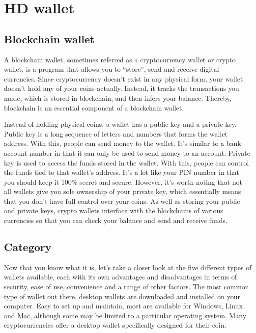 \begin{itemize}
\begin{quote}
        \end{quote}
\end{itemize}

\section{HD wallet}
\label{sec:hd_wallet}

\subsection{Blockchain wallet}
A blockchain wallet, sometimes referred as a cryptocurrency wallet or crypto wallet, is a program that allows you to “store”, send and receive digital currencies. Since cryptocurrency doesn’t exist in any physical form, your wallet doesn’t hold any of your coins actually. Instead, it tracks the transactions you made, which is stored in blockchain, and then infers your balance. Thereby, blockchain is an essential component of a blockchain wallet.

Instead of holding physical coins, a wallet has a public key and a private key. Public key is a long sequence of letters and numbers that forms the wallet address. With this, people can send money to the wallet. It's similar to a bank account number in that it can only be used to send money to an account. Private key is used to access the funds stored in the wallet. With this, people can control the funds tied to that wallet's address. It's a lot like your PIN number in that you should keep it 100\% secret and secure. However, it's worth noting that not all wallets give you sole ownership of your private key, which essentially means that you don't have full control over your coins. As well as storing your public and private keys, crypto wallets interface with the blockchains of various currencies so that you can check your balance and send and receive funds.

\subsection{Category}

Now that you know what it is, let’s take a closer look at the five different types of wallets available, each with its own advantages and disadvantages in terms of security, ease of use, convenience and a range of other factors. The most common type of wallet out there, desktop wallets are downloaded and installed on your computer. Easy to set up and maintain, most are available for Windows, Linux and Mac, although some may be limited to a particular operating system. Many cryptocurrencies offer a desktop wallet specifically designed for their coin.


